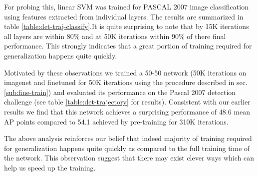 For probing this, linear SVM was trained for PASCAL 2007 image classification using features extracted from individual layers. The results are summarized in table \ref{table:det-traj-classify}.It is quite surprising to note that by 15K iterations all layers are within 80\% and at 50K iterations within 90\% of there final performance. This strongly indicates that a great portion of training required for generalization happens quite quickly. 

Motivated by these observations we trained a 50-50 network (50K iterations on imagenet and finetuned for 50K iterations using the procedure described in sec. \ref{sub:fine-train}) and evaluated its performance on the  Pascal 2007 detection challenge (see table \ref{table:det-trajectory} for results). Consistent with our earlier results we find that this network achieves a surprising performance of 48.6 mean AP points compared to 54.1 achieved by pre-training for 310K iterations. 

\setlength{\tabcolsep}{1pt}
\begin{table}[t!]
\begin{center}
\caption{Performance of 50-50 network for detection on pascal-voc-2007 challenge. (l5 is conv-5 and l7 is fc-7)}
\label{table:det-trajectory}
\end{center}
\end{table}
\setlength{\tabcolsep}{1.4pt}
The above analysis reinforces our belief that indeed majority of training required for generalization happens quite quickly as compared to the full training time of the network. This observation suggest that there may exist clever ways which can help us speed up the training.

